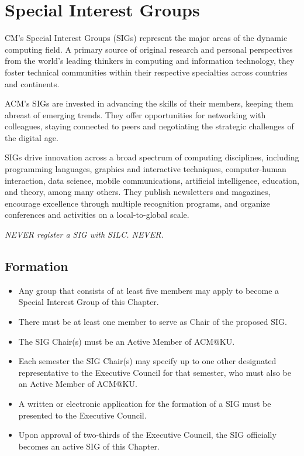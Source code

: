 %
%
\let\textcircled=\pgftextcircled
\chapter{Special Interest Groups}
\label{chap:SIGs}

CM's Special Interest Groups (SIGs) represent the major areas of the dynamic computing field.  A primary source of original research and personal perspectives from the world's leading thinkers in computing and information technology, they foster technical communities within their respective specialties across countries and continents.

ACM's SIGs are invested in advancing the skills of their members, keeping them abreast of emerging trends. They offer opportunities for networking with colleagues, staying connected to peers and negotiating the strategic challenges of the digital age.

SIGs drive innovation across a broad spectrum of computing disciplines, including programming languages, graphics and interactive techniques, computer-human interaction, data science, mobile communications, artificial intelligence, education, and theory, among many others. They publish newsletters and magazines, encourage excellence through multiple recognition programs, and organize conferences and activities on a local-to-global scale.

\textit{NEVER register a SIG with SILC. NEVER.}

\section{Formation}
\begin{itemize}
   \item Any group that consists of at least five members may apply to become a Special Interest Group of this Chapter.
   \item There must be at least one member to serve as Chair of the proposed SIG.
   \item The SIG Chair(s) must be an Active Member of ACM@KU.
   \item Each semester the SIG Chair(s) may specify up to one other designated representative to the Executive Council for that semester, who must also be an Active Member of ACM@KU.
   \item A written or electronic application for the formation of a SIG must be presented to the Executive Council.
   \item Upon approval of two-thirds of the Executive Council, the SIG officially becomes an active SIG of this Chapter.
\end{itemize}
